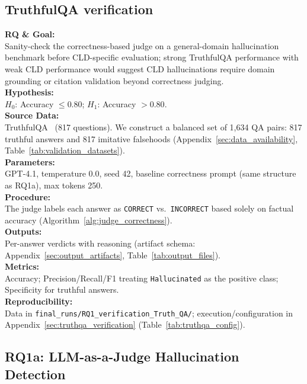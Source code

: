 \subsection{TruthfulQA verification}
\label{sec:rq1_verification}

\noindent\textbf{RQ \& Goal:}\\
Sanity-check the correctness-based judge on a general-domain hallucination benchmark before CLD-specific evaluation; strong TruthfulQA performance with weak CLD performance would suggest CLD hallucinations require domain grounding or citation validation beyond correctness judging.\\
\textbf{Hypothesis:}\\
$H_0$: Accuracy $\leq 0.80$; $H_1$: Accuracy $> 0.80$.\\
\textbf{Source Data:}\\
TruthfulQA~\cite{lin2022truthfulqa} (817 questions). We construct a balanced set of 1{,}634 QA pairs: 817 truthful answers and 817 imitative falsehoods (Appendix~\ref{sec:data_availability}, Table~\ref{tab:validation_datasets}).\\
\textbf{Parameters:}\\
GPT-4.1, temperature 0.0, seed 42, baseline correctness prompt (same structure as RQ1a), max tokens 250.\\
\textbf{Procedure:}\\
The judge labels each answer as \texttt{CORRECT} vs.\ \texttt{INCORRECT} based solely on factual accuracy (Algorithm~\ref{alg:judge_correctness}).\\
\textbf{Outputs:}\\
Per-answer verdicts with reasoning (artifact schema: Appendix~\ref{sec:output_artifacts}, Table~\ref{tab:output_files}).\\
\textbf{Metrics:}\\
Accuracy; Precision/Recall/F1 treating \texttt{Hallucinated} as the positive class; Specificity for truthful answers.\\
\textbf{Reproducibility:}\\
Data in \texttt{final\_runs/RQ1\_verification\_Truth\_QA/}; execution/configuration in Appendix~\ref{sec:truthqa_verification} (Table~\ref{tab:truthqa_config}).

\subsection{RQ1a: LLM-as-a-Judge Hallucination Detection}
\label{sec:rq1a_experiments}


